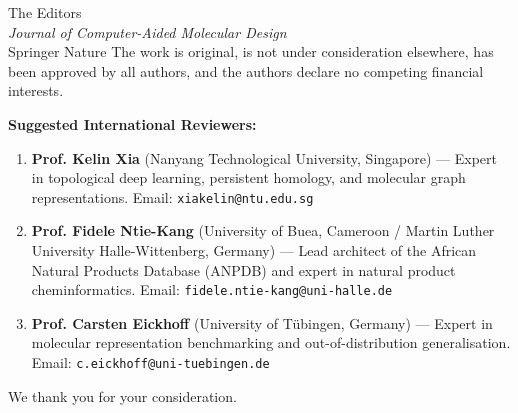 \documentclass[11pt,a4paper]{letter}
\begin{document}
\begin{letter}{%
  The Editors \\
  \textit{Journal of Computer-Aided Molecular Design} \\
  Springer Nature
}
The work is original, is not under consideration elsewhere, has been approved by all authors, and the authors declare no competing financial interests.

\vspace{0.4em}
\noindent\textbf{Suggested International Reviewers:}
\begin{enumerate}\setlength{\itemsep}{1pt}\setlength{\parskip}{0pt}
    \item \textbf{Prof. Kelin Xia} (Nanyang Technological University, Singapore) --- Expert in topological deep learning, persistent homology, and molecular graph representations. Email: \texttt{xiakelin@ntu.edu.sg}
    \item \textbf{Prof. Fidele Ntie-Kang} (University of Buea, Cameroon / Martin Luther University Halle-Wittenberg, Germany) --- Lead architect of the African Natural Products Database (ANPDB) and expert in natural product cheminformatics. Email: \texttt{fidele.ntie-kang@uni-halle.de}
    \item \textbf{Prof. Carsten Eickhoff} (University of T\"ubingen, Germany) --- Expert in molecular representation benchmarking and out-of-distribution generalisation. Email: \texttt{c.eickhoff@uni-tuebingen.de}
\end{enumerate}

\vspace{0.3em}
\closing{We thank you for your consideration.}

\end{letter}
\end{document}
